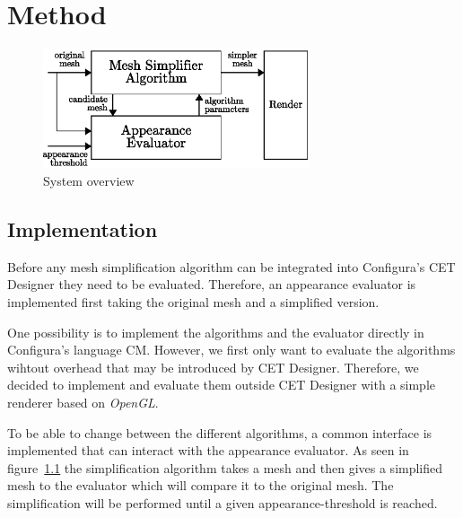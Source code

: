 
\chapter{Method} \label{cha:method}

    \begin{figure}[h]
        \centering
        \includegraphics[width=0.7\textwidth]{figures/system_overview.eps}
        \caption{System overview}
        \label{fig:system_overview}
    \end{figure}

    \section{Implementation} \label{sec:implementation}
    Before any mesh simplification algorithm can be integrated into Configura's CET Designer they need to be evaluated. Therefore, an appearance evaluator is implemented first taking the original mesh and a simplified version.

    One possibility is to implement the algorithms and the evaluator directly in Configura's language CM. However, we first only want to evaluate the algorithms wihtout overhead that may be introduced by CET Designer. Therefore, we decided to implement and evaluate them outside CET Designer with a simple renderer based on \emph{OpenGL}.

    To be able to change between the different algorithms, a common interface is implemented that can interact with the appearance evaluator. As seen in figure~\ref{fig:system_overview} the simplification algorithm takes a mesh and then gives a simplified mesh to the evaluator which will compare it to the original mesh. The simplification will be performed until a given appearance-threshold is reached.

